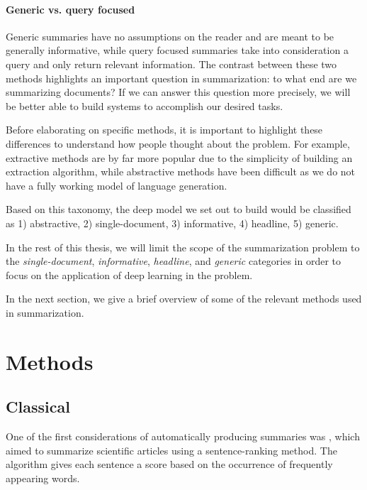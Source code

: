 \documentclass[11pt]{report}
\begin{document}
\paragraph{Generic vs. query focused} Generic summaries have no assumptions on the reader and are meant to be generally informative, while query focused summaries take into consideration a query and only return relevant information. The contrast between these two methods highlights an important question in summarization: to what end are we summarizing documents? If we can answer this question more precisely, we will be better able to build systems to accomplish our desired tasks.

\vspace{0.5cm}

Before elaborating on specific methods, it is important to highlight these differences to understand how people thought about the problem. For example, extractive methods are by far more popular due to the simplicity of building an extraction algorithm, while abstractive methods have been difficult as we do not have a fully working model of language generation.

Based on this taxonomy, the deep model we set out to build would be classified as 1) abstractive, 2) single-document, 3) informative, 4) headline, 5) generic.

In the rest of this thesis, we will limit the scope of the summarization problem to the \emph{single-document}, \emph{informative}, \emph{headline}, and \emph{generic} categories in order to focus on the application of deep learning in the problem.

In the next section, we give a brief overview of some of the relevant methods used in summarization.

\section{Methods}



\subsection{Classical}

One of the first considerations of automatically producing summaries was \cite{luhn1958automatic}, which aimed to summarize scientific articles using a sentence-ranking method. The algorithm gives each sentence a score based on the occurrence of frequently appearing words.
\end{document}
